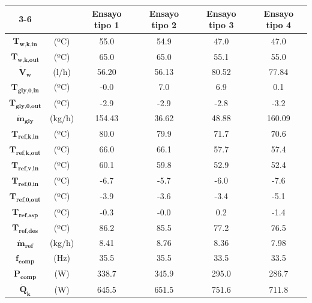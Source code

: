 \documentclass[../main.tex]{subfiles}
\begin{document}
\begin{table}[ht]
\centering
\begin{tabular}{cc|c|c|c|c|}
\cline{3-6}
 & & \textbf{Ensayo tipo 1} & \textbf{Ensayo tipo 2} & \textbf{Ensayo tipo 3} & \textbf{Ensayo tipo 4} \\
\hline
\multicolumn{1}{|c}{$\textbf{T}_\textbf{w,k,in}$} & (ºC) & 55.0 & 54.9 & 47.0 & 47.0 \\
\hline
\multicolumn{1}{|c}{$\textbf{T}_\textbf{w,k,out}$} & (ºC) & 65.0 & 65.0 & 55.1 & 55.0 \\
\hline
\multicolumn{1}{|c}{$\dot{\textbf{V}}_\textbf{w}$} & (l/h) & 56.20 & 56.13 & 80.52 & 77.84 \\
\hline
\multicolumn{1}{|c}{$\textbf{T}_\textbf{gly,0,in}$} & (ºC) & -0.0 & 7.0 & 6.9 & 0.1 \\
\hline
\multicolumn{1}{|c}{$\textbf{T}_\textbf{gly,0,out}$} & (ºC) & -2.9 & -2.9 & -2.8 & -3.2 \\
\hline
\multicolumn{1}{|c}{$\dot{\textbf{m}}_\textbf{gly}$} & (kg/h) & 154.43 & 36.62 & 48.88 & 160.09 \\
\hline
\multicolumn{1}{|c}{$\textbf{T}_\textbf{ref,k,in}$} & (ºC) & 80.0 & 79.9 & 71.7 & 70.6 \\
\hline
\multicolumn{1}{|c}{$\textbf{T}_\textbf{ref,k,out}$} & (ºC) & 66.0 & 66.1 & 57.7 & 57.4 \\
\hline
\multicolumn{1}{|c}{$\textbf{T}_\textbf{ref,v,in}$} & (ºC) & 60.1 & 59.8 & 52.9 & 52.4 \\
\hline
\multicolumn{1}{|c}{$\textbf{T}_\textbf{ref,0,in}$} & (ºC) & -6.7 & -5.7 & -6.0 & -7.6 \\
\hline
\multicolumn{1}{|c}{$\textbf{T}_\textbf{ref,0,out}$} & (ºC) & -3.9 & -3.6 & -3.4 & -5.1 \\
\hline
\multicolumn{1}{|c}{$\textbf{T}_\textbf{ref,asp}$} & (ºC) & -0.3 & -0.0 & 0.2 & -1.4 \\
\hline
\multicolumn{1}{|c}{$\textbf{T}_\textbf{ref,des}$} & (ºC) & 86.2 & 85.5 & 77.2 & 76.5 \\
\hline
\multicolumn{1}{|c}{$\dot{\textbf{m}}_\textbf{ref}$} & (kg/h) & 8.41 & 8.76 & 8.36 & 7.98 \\
\hline
\multicolumn{1}{|c}{$\textbf{f}_\textbf{comp}$} & (Hz) & 35.5 & 35.5 & 33.5 & 33.5 \\
\hline
\multicolumn{1}{|c}{$\textbf{P}_\textbf{comp}$} & (W) & 338.7 & 345.9 & 295.0 & 286.7 \\
\hline
\multicolumn{1}{|c}{$\dot{\textbf{Q}}_\textbf{k}$} & (W) & 645.5 & 651.5 & 751.6 & 711.8 \\

\end{tabular}
\end{table}
\end{document}
